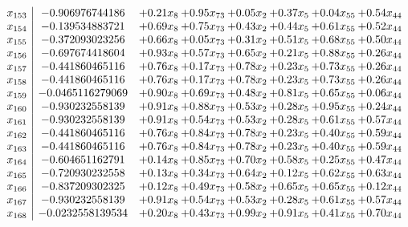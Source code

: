 \documentclass[8pt]{article}
\begin{document}
\[\begin{array}{c| c c@{\hskip 2pt} c@{\hskip 2pt} c@{\hskip 2pt} c@{\hskip 2pt} c@{\hskip 2pt} c@{\hskip 2pt} }
 x_{153}   &  -0.906976744186 & +  0.21 x_{8} & +  0.95 x_{73} & +  0.05 x_{2} & +  0.37 x_{5} & +  0.04 x_{55} & +  0.54 x_{44}\\
 x_{154}   &  -0.139534883721 & +  0.69 x_{8} & +  0.75 x_{73} & +  0.43 x_{2} & +  0.44 x_{5} & +  0.61 x_{55} & +  0.52 x_{44}\\
 x_{155}   &  -0.372093023256 & +  0.66 x_{8} & +  0.05 x_{73} & +  0.31 x_{2} & +  0.51 x_{5} & +  0.68 x_{55} & +  0.50 x_{44}\\
 x_{156}   &  -0.697674418604 & +  0.93 x_{8} & +  0.57 x_{73} & +  0.65 x_{2} & +  0.21 x_{5} & +  0.88 x_{55} & +  0.26 x_{44}\\
 x_{157}   &  -0.441860465116 & +  0.76 x_{8} & +  0.17 x_{73} & +  0.78 x_{2} & +  0.23 x_{5} & +  0.73 x_{55} & +  0.26 x_{44}\\
 x_{158}   &  -0.441860465116 & +  0.76 x_{8} & +  0.17 x_{73} & +  0.78 x_{2} & +  0.23 x_{5} & +  0.73 x_{55} & +  0.26 x_{44}\\
 x_{159}   &  -0.0465116279069 & +  0.90 x_{8} & +  0.69 x_{73} & +  0.48 x_{2} & +  0.81 x_{5} & +  0.65 x_{55} & +  0.06 x_{44}\\
 x_{160}   &  -0.930232558139 & +  0.91 x_{8} & +  0.88 x_{73} & +  0.53 x_{2} & +  0.28 x_{5} & +  0.95 x_{55} & +  0.24 x_{44}\\
 x_{161}   &  -0.930232558139 & +  0.91 x_{8} & +  0.54 x_{73} & +  0.53 x_{2} & +  0.28 x_{5} & +  0.61 x_{55} & +  0.57 x_{44}\\
 x_{162}   &  -0.441860465116 & +  0.76 x_{8} & +  0.84 x_{73} & +  0.78 x_{2} & +  0.23 x_{5} & +  0.40 x_{55} & +  0.59 x_{44}\\
 x_{163}   &  -0.441860465116 & +  0.76 x_{8} & +  0.84 x_{73} & +  0.78 x_{2} & +  0.23 x_{5} & +  0.40 x_{55} & +  0.59 x_{44}\\
 x_{164}   &  -0.604651162791 & +  0.14 x_{8} & +  0.85 x_{73} & +  0.70 x_{2} & +  0.58 x_{5} & +  0.25 x_{55} & +  0.47 x_{44}\\
 x_{165}   &  -0.720930232558 & +  0.13 x_{8} & +  0.34 x_{73} & +  0.64 x_{2} & +  0.12 x_{5} & +  0.62 x_{55} & +  0.63 x_{44}\\
 x_{166}   &  -0.837209302325 & +  0.12 x_{8} & +  0.49 x_{73} & +  0.58 x_{2} & +  0.65 x_{5} & +  0.65 x_{55} & +  0.12 x_{44}\\
 x_{167}   &  -0.930232558139 & +  0.91 x_{8} & +  0.54 x_{73} & +  0.53 x_{2} & +  0.28 x_{5} & +  0.61 x_{55} & +  0.57 x_{44}\\
 x_{168}   &  -0.0232558139534 & +  0.20 x_{8} & +  0.43 x_{73} & +  0.99 x_{2} & +  0.91 x_{5} & +  0.41 x_{55} & +  0.70 x_{44}\\

\end{array}\]
\end{document}
